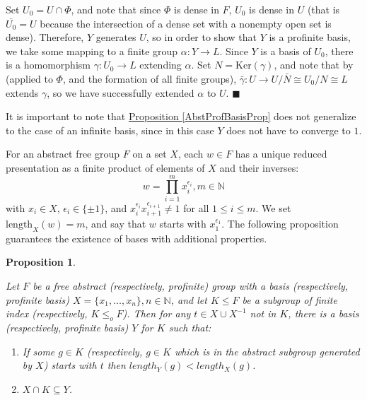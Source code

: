 \documentclass[12pt,a4paper]{article}
\newtheorem{proposition}[theorem]{Proposition}
\newenvironment{proof}[1][Proof]{\begin{trivlist}
\item[\hskip \labelsep {\bfseries #1}]}{\end{trivlist}}
\newcommand{\propref}[1]{\hyperref[#1]{Proposition \ref*{#1}}}
\begin{document}
\begin{proof}

Set $U_0 = U \cap \Phi$, and note that since $\Phi$ is dense in $F$, $U_0$ is dense in $U$ (that is $\overline{U_0} = U$ because the intersection of a dense set with a nonempty open set is dense). Therefore, $Y$ generates $U$, so in order to show that $Y$ is a profinite basis, we take some mapping to a finite group $\alpha \colon Y \rightarrow L$. Since $Y$ is a basis of $U_0$, there is a homomorphism $\gamma \colon U_0 \rightarrow L$ extending $\alpha$. Set $N = \text{Ker}(\gamma)$, and note that by \cite[Proposition 3.2.2 (d)]{RZ} (applied to $\Phi$, and the formation of all finite groups), $\bar{\gamma} \colon U \rightarrow U/\bar{N} \cong U_0/N \cong L$ extends $\gamma$, so we have successfully extended $\alpha$ to $U$. $\blacksquare$  

\end{proof}

It is important to note that \propref{AbstProfBasisProp} does not generalize to the case of an infinite basis, since in this case $Y$ does not have to converge to $1$.

For an abstract free group $F$ on a set $X$, each $w \in F$ has a unique reduced presentation as a finite product of elements of $X$ and their inverses: $$ w = \prod_{i = 1}^{m} x_i^{\epsilon_i} , m \in \mathbb{N}$$ with $x_i \in X$, $\epsilon_i \in \{\pm 1\}$, and $x_i^{\epsilon_i}x_{i+1}^{\epsilon_{i + 1}} \neq 1$ for all $1 \leq i \leq m$. We set $\text{length}_X(w) = m$, and say that $w$ starts with $x_1^{\epsilon_1}$. The following proposition guarantees the existence of bases with additional properties.


\begin{proposition} \label{BasesProp}

Let $F$ be a free abstract (respectively, profinite) group with a basis (respectively, profinite basis) $X = \{x_1, \dots, x_n\}, n \in \mathbb{N}$, and let $K \leq F$ be a subgroup of finite index (respectively, $K \leq_o F$). Then for any $t \in X \cup X^{-1}$ not in $K$, there is a basis (respectively, profinite basis) $Y$ for $K$ such that:

\begin{enumerate}

\item If some $g \in K$ (respectively, $g \in K$ which is in the abstract subgroup generated by $X$) starts with $t$ then $length_Y(g) < length_X(g)$.

\item $X \cap K \subseteq Y$.

\end{enumerate}

\end{proposition}
\end{document}

